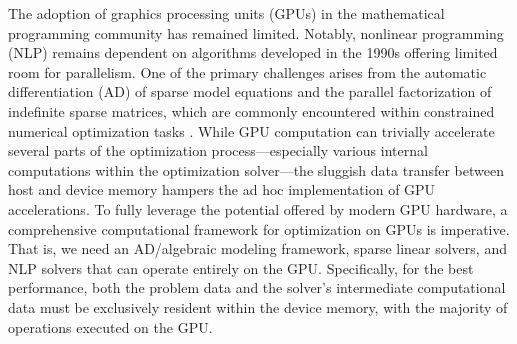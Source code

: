 \documentclass{IEEEtran4PSCC} %
\begin{document}
The adoption of graphics processing units (GPUs) in the mathematical programming community has remained
limited. Notably, nonlinear programming (NLP) remains dependent on
algorithms developed in the 1990s offering limited room for parallelism.
One of the primary challenges arises from the
automatic differentiation (AD) of sparse model equations and the
parallel factorization of indefinite sparse matrices, which are
commonly encountered within constrained numerical optimization tasks
\cite{anitescu2021targeting}. While GPU computation can trivially
accelerate several parts of the optimization process---especially
various internal computations within the optimization solver---the
sluggish data transfer between host and device memory hampers the
ad hoc implementation of GPU accelerations. To
fully leverage the potential offered by modern GPU hardware, a comprehensive computational framework for
optimization on GPUs is imperative. That is, we need an AD/algebraic
modeling framework, sparse linear solvers, and NLP solvers that can
operate entirely on the GPU. Specifically, for the best performance,
both the problem data and the solver's intermediate computational data
must be exclusively resident within the device memory, with the
majority of operations executed on the GPU.







\end{document}
